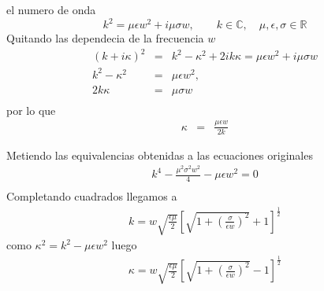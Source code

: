 el numero de onda
\begin{equation}
k^2=\mu \epsilon w^2 + i \mu \sigma w, \qquad k \in \mathbb{C}, \quad \mu, \epsilon, \sigma \in \mathbb{R}
\end{equation}
Quitando las dependecia de la frecuencia $w$ 
\begin{subequations}
	\begin{eqnarray}
	(k+i\kappa)^2 &=& k^2-\kappa^2+2ik\kappa=\mu\epsilon w^2+i\mu\sigma w \nonumber \\
	k^2 - \kappa^2 &=& \mu \epsilon w^2, \\ 
	2 k \kappa &=& \mu \sigma w \nonumber \\
	\end{eqnarray}
\end{subequations}
por lo que 
\begin{eqnarray}
\kappa &=& \frac{\mu \epsilon w}{2 k}
\end{eqnarray}


Metiendo las equivalencias obtenidas a las ecuaciones originales 
\begin{subequations}
	\begin{eqnarray}
	k^4 - \frac{\mu^2 \sigma^2 w^2}{4} - \mu \epsilon w^2=0 \nonumber\\
	\end{eqnarray}
\end{subequations}
Completando cuadrados llegamos a 
\begin{subequations}
	\begin{eqnarray}
	k= w \sqrt{\frac{\epsilon \mu}{2}} \left[\sqrt{1+\left(\frac{\sigma}{\epsilon w} \right)^2}+1 \right]^\frac{1}{2}
	\end{eqnarray}
\end{subequations}
como $\kappa^2 = k^2 - \mu \epsilon w^2$ luego
\begin{subequations}
	\begin{eqnarray}
	\kappa = w \sqrt{\frac{\epsilon \mu}{2}} \left[\sqrt{1 + \left(\frac{\sigma}{\epsilon w} \right)^2}-1\right]^\frac{1}{2}
	\end{eqnarray}
\end{subequations}
